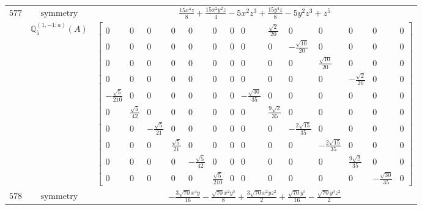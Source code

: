 \documentclass[fleqn,8pt,landscape]{jsarticle}
\begin{document}
\begin{longtable}{ccc}
$ 577 $ & $ \text{symmetry} $ & $ \frac{15 x^{4} z}{8} + \frac{15 x^{2} y^{2} z}{4} - 5 x^{2} z^{3} + \frac{15 y^{4} z}{8} - 5 y^{2} z^{3} + z^{5} $ \\
$  $ & $ \mathbb{Q}_{5}^{(1,-1;a)}(A) $ & $ \begin{bmatrix} 0 & 0 & 0 & 0 & 0 & 0 & 0 & 0 & \frac{\sqrt{2}}{20} & 0 & 0 & 0 & 0 & 0 \\ 0 & 0 & 0 & 0 & 0 & 0 & 0 & 0 & 0 & - \frac{\sqrt{10}}{20} & 0 & 0 & 0 & 0 \\ 0 & 0 & 0 & 0 & 0 & 0 & 0 & 0 & 0 & 0 & \frac{\sqrt{10}}{20} & 0 & 0 & 0 \\ 0 & 0 & 0 & 0 & 0 & 0 & 0 & 0 & 0 & 0 & 0 & - \frac{\sqrt{2}}{20} & 0 & 0 \\ - \frac{\sqrt{5}}{210} & 0 & 0 & 0 & 0 & 0 & 0 & - \frac{\sqrt{30}}{35} & 0 & 0 & 0 & 0 & 0 & 0 \\ 0 & \frac{\sqrt{5}}{42} & 0 & 0 & 0 & 0 & 0 & 0 & \frac{9 \sqrt{2}}{35} & 0 & 0 & 0 & 0 & 0 \\ 0 & 0 & - \frac{\sqrt{5}}{21} & 0 & 0 & 0 & 0 & 0 & 0 & - \frac{2 \sqrt{15}}{35} & 0 & 0 & 0 & 0 \\ 0 & 0 & 0 & \frac{\sqrt{5}}{21} & 0 & 0 & 0 & 0 & 0 & 0 & - \frac{2 \sqrt{15}}{35} & 0 & 0 & 0 \\ 0 & 0 & 0 & 0 & - \frac{\sqrt{5}}{42} & 0 & 0 & 0 & 0 & 0 & 0 & \frac{9 \sqrt{2}}{35} & 0 & 0 \\ 0 & 0 & 0 & 0 & 0 & \frac{\sqrt{5}}{210} & 0 & 0 & 0 & 0 & 0 & 0 & - \frac{\sqrt{30}}{35} & 0 \end{bmatrix} $ \\ \hline
$ 578 $ & $ \text{symmetry} $ & $ - \frac{3 \sqrt{70} x^{4} y}{16} - \frac{\sqrt{70} x^{2} y^{3}}{8} + \frac{3 \sqrt{70} x^{2} y z^{2}}{2} + \frac{\sqrt{70} y^{5}}{16} - \frac{\sqrt{70} y^{3} z^{2}}{2} $ \\

\end{longtable}
\end{document}
